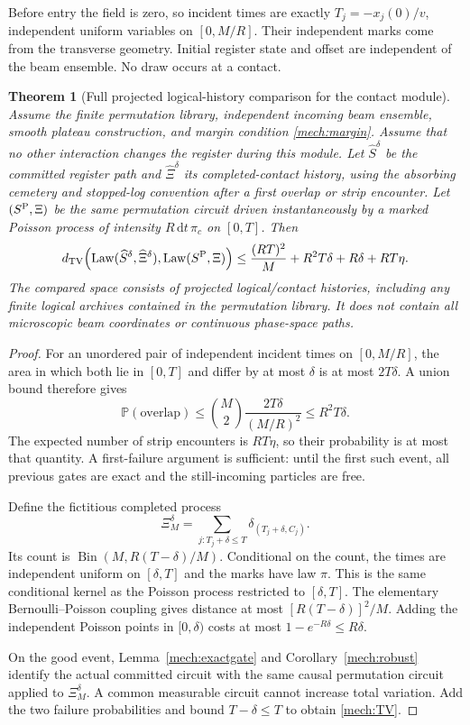 \documentclass[11pt]{article}
\newtheorem{theorem}{Theorem}[section]
\theoremstyle{definition}\newtheorem{definition}[theorem]{Definition}
\theoremstyle{remark}\newtheorem{remark}[theorem]{Remark}
\newcommand{\Law}{\operatorname{Law}}\newcommand{\TV}{d_{\mathrm{TV}}}
\newcommand{\dd}{\,\mathrm d}\newcommand{\Var}{\operatorname{Var}}
\begin{document}
Before entry the field is zero, so incident times are exactly
$T_j=-x_j(0)/v$, independent uniform variables on $[0,M/R]$.
Their independent marks come from the transverse geometry. Initial register
state and offset are independent of the beam ensemble. No draw occurs at
a contact.

\begin{theorem}[Full projected logical-history comparison for the contact module]
\label{mech:history}
Assume the finite permutation library, independent incoming beam ensemble,
smooth plateau construction, and margin condition
\eqref{mech:margin}. Assume that no other interaction changes the register
during this module. Let $\widehat S^\delta$ be the committed register path
and $\widehat\Xi^\delta$ its completed-contact history, using the absorbing
cemetery and stopped-log convention after a first overlap or strip encounter.
Let $(S^{\rm P},\Xi)$ be the same permutation circuit driven instantaneously
by a marked Poisson process of intensity $R\dd t\,\pi_c$ on $[0,T]$.
Then
\begin{equation}\label{mech:TV}
 \TV\!\left(
 \Law(\widehat S^\delta,\widehat\Xi^\delta),
 \Law(S^{\rm P},\Xi)\right)
 \le
 \frac{(RT)^2}{M}+R^2T\delta+R\delta+RT\eta.
\end{equation}
The compared space consists of projected logical/contact histories, including
any finite logical archives contained in the permutation library.
It does not contain all microscopic beam coordinates or continuous
phase-space paths.
\end{theorem}
\begin{proof}
For an unordered pair of independent incident times on $[0,M/R]$, the
area in which both lie in $[0,T]$ and differ by at most $\delta$ is at most
$2T\delta$. A union bound therefore gives
\[
 \mathbb P(\text{overlap})\le
 {M\choose2}\frac{2T\delta}{(M/R)^2}\le R^2T\delta.
\]
The expected number of strip encounters is $RT\eta$, so their probability
is at most that quantity. A first-failure argument is sufficient: until
the first such event, all previous gates are exact and the still-incoming
particles are free.

Define the fictitious completed process
\[
 \Xi_M^\delta=\sum_{j:T_j+\delta\le T}
                 \delta_{(T_j+\delta,C_j)}.
\]
Its count is $\operatorname{Bin}(M,R(T-\delta)/M)$.
Conditional on the count, the times are independent uniform on $[\delta,T]$
and the marks have law $\pi$. This is the same conditional kernel as the
Poisson process restricted to $[\delta,T]$.
The elementary Bernoulli--Poisson coupling gives distance at most
$[R(T-\delta)]^2/M$. Adding the independent Poisson points in $[0,\delta)$
costs at most $1-e^{-R\delta}\le R\delta$.

On the good event, Lemma~\ref{mech:exactgate} and
Corollary~\ref{mech:robust} identify the actual committed circuit with the
same causal permutation circuit applied to $\Xi_M^\delta$.
A common measurable circuit cannot increase total variation.
Add the two failure probabilities and bound $T-\delta\le T$ to obtain
\eqref{mech:TV}.
\end{proof}
\end{document}
